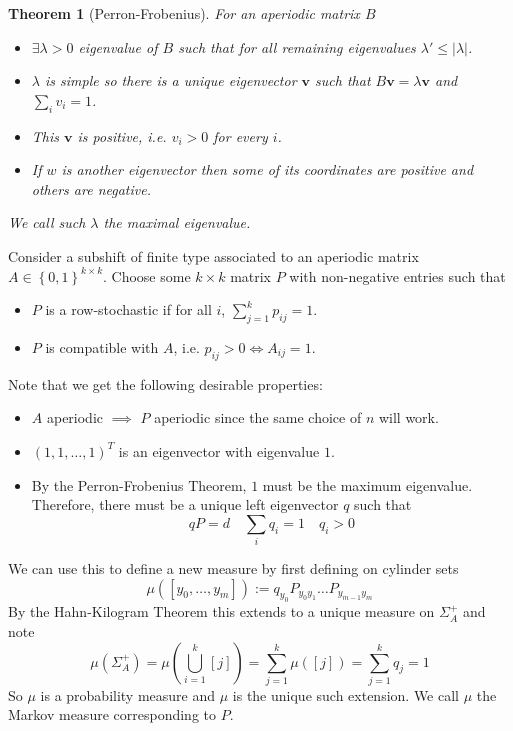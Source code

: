 \documentclass[11pt]{article}
\newcommand{\defeq}{:=}
\newcommand{\abs}[1]{\left|#1\right|}
\newcommand{\mv}[1]{\textbf{#1}}
\newcommand{\mdf}[1]{{\color{red} #1}}
\newtheorem{theorem}[prop]{Theorem}
\begin{document}
\begin{theorem}[Perron-Frobenius]
For an aperiodic matrix $B$
\begin{itemize}
	\item $\exists \lambda > 0$ eigenvalue of $B$ such that for all remaining eigenvalues $\lambda' \leq \abs{\lambda}$.
	\item $\lambda$ is simple so there is a unique eigenvector $\mv{v}$ such that $B\mv{v} = \lambda\mv{v}$ and $\sum_{i}v_i=1$.
	\item This $\mv{v}$ is positive, i.e. $v_i > 0$ for every $i$.
	\item If $w$ is another eigenvector then some of its coordinates are positive and others are negative.
\end{itemize}
We call such $\lambda$ the \mdf{maximal eigenvalue}.
\end{theorem}

Consider a subshift of finite type associated to an aperiodic matrix $A\in\left\{ 0, 1\right\}^{k\times k}$.
Choose some $k\times k$ matrix $P$ with non-negative entries such that
\begin{itemize}
	\item $P$ is a \mdf{row-stochastic} if for all $i$, $\sum_{j=1}^k p_{ij} =1$.
	\item $P$ is \mdf{compatible with $A$}, i.e. $p_{ij} >0 \iff A_{ij}=1$.
\end{itemize}

Note that we get the following desirable properties:
\begin{itemize}
	\item $A$ aperiodic $\implies$ $P$ aperiodic since the same choice of $n$ will work.
	\item $(1, 1, \dots, 1)^T$ is an eigenvector with eigenvalue $1$.
	\item By the Perron-Frobenius Theorem, $1$ must be the maximum eigenvalue.
		Therefore, there must be a unique left eigenvector $q$ such that
		\[
			qP = d \quad \sum_{i}q_i = 1\quad q_i >0
		\]
\end{itemize}
We can use this to define a new measure by first defining on cylinder sets
\[
	\mu(\left[ y_0, \dots, y_m \right]) \defeq q_{y_0}P_{y_0 y_1}\dots P_{y_{m-1}y_m}
\]
By the Hahn-Kilogram Theorem this extends to a unique measure on $\Sigma_A^+$ and note
\[
	\mu(\Sigma_A^+)=\mu\left( \bigcup_{i=1}^k [j] \right)=\sum_{j=1}^k \mu( \left[ j\right]) = \sum_{j=1}^k q_j =1
\]
So $\mu$ is a probability measure and $\mu$ is the unique such extension.
We call $\mu$ the \mdf{Markov measure corresponding to $P$}.
\end{document}
